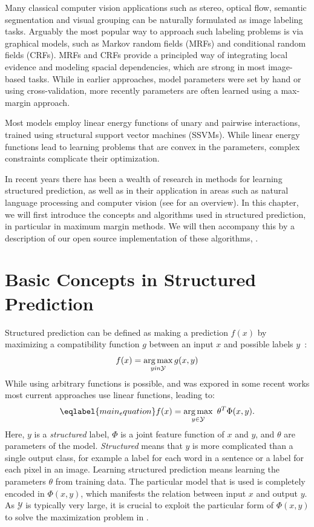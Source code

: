 Many classical computer vision applications such as stereo, optical flow, semantic
segmentation and visual grouping can be naturally formulated as image labeling tasks.
%
Arguably the most popular way to approach such labeling problems is via graphical
models, such as Markov random fields (MRFs) and conditional random fields (CRFs).
MRFs and CRFs provide a principled way of integrating local evidence and
modeling spacial dependencies, which are strong in most image-based tasks.
%
While in earlier approaches, model parameters were set by hand or using
cross-validation, more recently parameters are often learned using a max-margin
approach.

Most models employ linear energy functions of unary and pairwise interactions,
trained using structural support vector machines (SSVMs). While linear energy
functions lead to learning problems that are convex in the parameters, complex
constraints complicate their optimization. 

In recent years there has been a wealth of research in methods for learning
structured prediction, as well as in their application in areas such as natural
language processing and computer vision (see \citet{nowozin2011structured} for
an overview).
%
In this chapter, we will first introduce the concepts and algorithms used in
structured prediction, in particular in maximum margin methods. We will then
accompany this by a description of our open source implementation of these
algorithms, \pystruct.

\section{Basic Concepts in Structured Prediction}

Structured prediction can be defined as making a prediction $f(x)$ by maximizing a
compatibility function $g$ between an input $x$ and possible labels
$y$~\citep{nowozin2011structured}:
\begin{equation}
    f(x) = \operatorname*{arg\,max}_{y in \mathcal{Y}} g(x, y)
\end{equation}
While using arbitrary functions is possible, and was expored
in some recent works %
most current approaches use linear functions, leading to:
\begin{equation}\eqlabel{main_equation}
    f(x) = \argmax_{y \in \mathcal{Y}}\  \theta^T \Phi(x, y).
\end{equation}
Here, $y$ is a \emph{structured} label, $\Phi$ is a joint feature function of
$x$ and $y$, and $\theta$ are parameters of the model. \emph{Structured} means
that $y$ is more complicated than a single output class, for example a label
for each word in a sentence or a label for each pixel in an image.
Learning structured prediction means learning the parameters $\theta$ from training data.
The particular model that is used is completely encoded in $\Phi(x, y)$, which manifests
the relation between input $x$ and output $y$. As $\mathcal{Y}$ is typically very large,
it is crucial to exploit the particular form of $\Phi(x, y)$ to solve the maximization problem
in .

